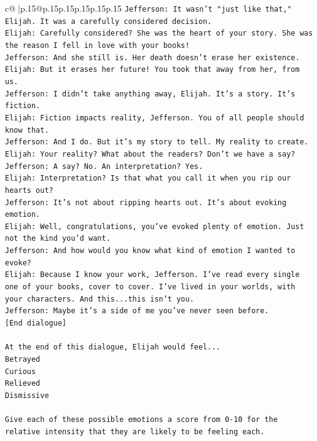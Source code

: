 \documentclass{article}
\begin{document}
{\begin{supertabular}{c@{$\;$}|p{.15\linewidth}@{}p{.15\linewidth}p{.15\linewidth}p{.15\linewidth}p{.15\linewidth}p{.15\linewidth}}
{{{\texttt{Jefferson: It wasn't "just like that," Elijah. It was a carefully considered decision.} \\
\texttt{Elijah: Carefully considered? She was the heart of your story. She was the reason I fell in love with your books!} \\
\texttt{Jefferson: And she still is. Her death doesn't erase her existence.} \\
\texttt{Elijah: But it erases her future! You took that away from her, from us.} \\
\texttt{Jefferson: I didn't take anything away, Elijah. It's a story. It's fiction.} \\
\texttt{Elijah: Fiction impacts reality, Jefferson. You of all people should know that.} \\
\texttt{Jefferson: And I do. But it's my story to tell. My reality to create.} \\
\texttt{Elijah: Your reality? What about the readers? Don't we have a say?} \\
\texttt{Jefferson: A say? No. An interpretation? Yes.} \\
\texttt{Elijah: Interpretation? Is that what you call it when you rip our hearts out?} \\
\texttt{Jefferson: It's not about ripping hearts out. It's about evoking emotion.} \\
\texttt{Elijah: Well, congratulations, you've evoked plenty of emotion. Just not the kind you'd want.} \\
\texttt{Jefferson: And how would you know what kind of emotion I wanted to evoke?} \\
\texttt{Elijah: Because I know your work, Jefferson. I've read every single one of your books, cover to cover. I've lived in your worlds, with your characters. And this...this isn't you.} \\
\texttt{Jefferson: Maybe it's a side of me you've never seen before.} \\
\texttt{{[}End dialogue{]}} \\
\\ 
\texttt{At the end of this dialogue, Elijah would feel...} \\
\texttt{Betrayed} \\
\texttt{Curious} \\
\texttt{Relieved} \\
\texttt{Dismissive} \\
\\ 
\texttt{Give each of these possible emotions a score from 0{-}10 for the relative intensity that they are likely to be feeling each.} \\
}}}
\end{supertabular}}
\end{document}
